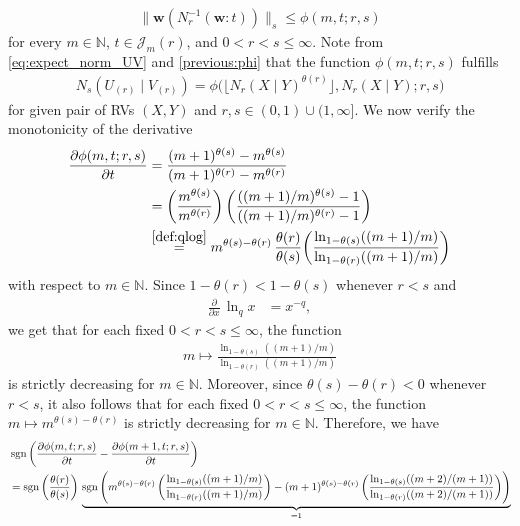 \documentclass[conference, draftcls, onecolumn]{IEEEtran}
\theoremstyle{plain}
\newcommand{\bvec}[1]{\boldsymbol{#1}}
\newcommand{\sgn}{\operatorname{sgn}}
\newcommand{\thref}[1]{Theorem~\ref{#1}}
\begin{document}
\begin{IEEEproof}[Proof of \thref{th:UV}]
\begin{align}
\| \bvec{w}( N_{r}^{-1}( \bvec{w} : t ) ) \|_{s}
\le
\phi(m, t; r, s)
\label{eq:phi_another}
\end{align}
for every $m \in \mathbb{N}$, $t \in \mathcal{J}_{m}( r )$, and $0 < r < s \le \infty$.
Note from \eqref{eq:expect_norm_UV} and \eqref{previous:phi} that the function $\phi(m, t; r, s)$ fulfills
\begin{align}
N_{s}(U_{(r)} \mid V_{(r)})
=
\phi\big( \big\lfloor N_{r}(X \mid Y)^{\theta( r )} \big\rfloor, N_{r}(X \mid Y); r, s \big)
\label{eq:UV_phi}
\end{align}
for given pair of RVs $(X, Y)$ and $r, s \in (0, 1) \cup (1, \infty]$.
We now verify the monotonicity of the derivative
\begin{align}
\frac{ \partial \phi(m, t; r, s) }{ \partial t }
& =
\frac{ (m+1)^{\theta( s )} - m^{\theta( s )} }{ (m+1)^{\theta( r )} - m^{\theta( r )} }
\\
& =
\bigg( \frac{ m^{\theta( s )} }{ m^{\theta( r )} } \bigg) \, \bigg( \frac{ ((m+1)/m)^{\theta( s )} - 1 }{ ((m+1)/m)^{\theta( r )} - 1 } \bigg)
\\
& \overset{\eqref{def:qlog}}{=}
m^{\theta( s ) - \theta( r )} \, \frac{ \theta( r ) }{ \theta( s ) } \bigg( \frac{ \ln_{1-\theta(s)} ((m+1)/m) }{ \ln_{1-\theta(r)} ((m+1)/m) } \bigg)
\label{diff:phi_mtrs}
\end{align}
with respect to $m \in \mathbb{N}$.
Since $1 - \theta( r ) < 1 - \theta( s )$ whenever $r < s$ and
\begin{align}
\frac{ \partial }{ \partial x } \, \ln_{q} x
& =
x^{-q} ,
\end{align}
we get that for each fixed $0 < r < s \le \infty$, the function
\begin{align}
m \mapsto \frac{ \ln_{1-\theta(s)} ((m+1)/m) }{ \ln_{1-\theta(r)} ((m+1)/m) }
\end{align}
is strictly decreasing for $m \in \mathbb{N}$.
Moreover, since $\theta( s ) - \theta( r ) < 0$ whenever $r < s$, it also follows that for each fixed $0 < r < s \le \infty$, the function $m \mapsto m^{\theta( s ) - \theta( r )}$ is strictly decreasing for $m \in \mathbb{N}$.
Therefore, we have
\begin{align}
&
\sgn\bigg( \frac{ \partial \phi(m, t; r, s) }{ \partial t } - \frac{ \partial \phi(m+1, t; r, s) }{ \partial t } \bigg)
\notag \\
& =
\sgn\bigg( \frac{ \theta( r ) }{ \theta( s ) } \bigg) \, \underbrace{ \sgn\Bigg( m^{\theta( s ) - \theta( r )} \, \bigg( \frac{ \ln_{1-\theta(s)} ((m+1)/m) }{ \ln_{1-\theta(r)} ((m+1)/m) } \bigg) - (m+1)^{\theta( s ) - \theta( r )} \, \bigg( \frac{ \ln_{1-\theta(s)} ((m+2)/(m+1)) }{ \ln_{1-\theta(r)} ((m+2)/(m+1)) } \bigg) \Bigg) }_{ = 1 }

\end{align}
\end{IEEEproof}
\end{document}
